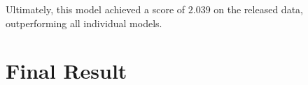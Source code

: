\documentclass[10pt,letterpaper]{article}
\begin{document}
Ultimately, this model achieved a score of $2.039$ on the released data, outperforming all individual models.

\section{Final Result}

\newpage
















\end{document}
